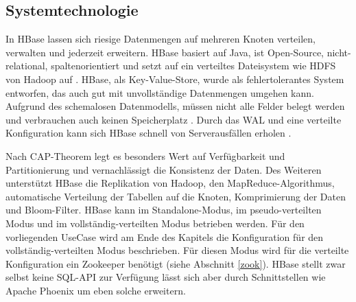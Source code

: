 
\subsection{Systemtechnologie} %
 In HBase lassen sich riesige Datenmengen auf mehreren Knoten verteilen, verwalten und jederzeit erweitern. HBase basiert auf Java, ist Open-Source, nicht-relational, spaltenorientiert und setzt auf ein verteiltes Dateisystem wie \ac{HDFS} von Hadoop auf \cite{hbasetut}. HBase, als Key-Value-Store, wurde als fehlertolerantes System entworfen, das auch gut mit unvollständige Datenmengen umgehen kann. Aufgrund des schemalosen Datenmodells, müssen nicht alle Felder belegt werden und verbrauchen auch keinen Speicherplatz \cite{compWo}.  Durch das \ac{WAL} und eine verteilte Konfiguration kann sich HBase schnell von Serverausfällen erholen \cite{Redt01}. 
 
 Nach CAP-Theorem legt es besonders Wert auf Verfügbarkeit und Partitionierung und vernachlässigt die Konsistenz der Daten. 
 Des Weiteren unterstützt HBase die Replikation von Hadoop, den MapReduce-Algorithmus, automatische Verteilung der Tabellen auf die Knoten, Komprimierung der Daten und Bloom-Filter. HBase kann im Standalone-Modus, im pseudo-verteilten Modus und im vollständig-verteilten Modus betrieben werden. Für den vorliegenden UseCase wird am Ende des Kapitels die Konfiguration für den vollständig-verteilten Modus beschrieben. Für diesen Modus wird für die verteilte Konfiguration ein Zookeeper benötigt (siehe Abschnitt \ref{zook}). HBase stellt zwar selbst keine SQL-API zur Verfügung lässt sich aber durch Schnittstellen wie Apache Phoenix um eben solche erweitern.

